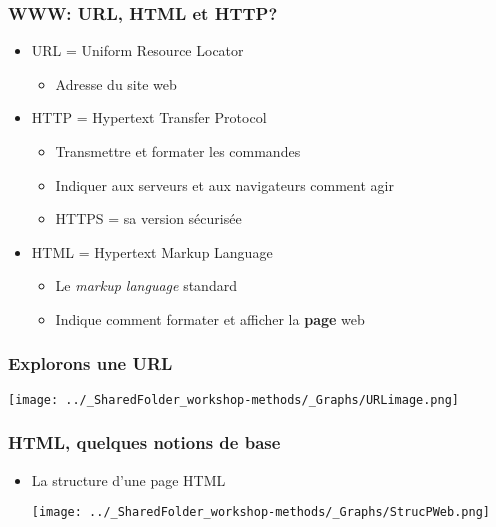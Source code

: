 \documentclass{beamer}
\begin{document}
      \begin{frame}
        \frametitle{WWW: URL, HTML et HTTP?}
        \begin{itemize}
          \item<2-> URL = Uniform Resource Locator
            \begin{itemize}
              \item Adresse du site web
            \end{itemize}
          \item<3-> HTTP = Hypertext Transfer Protocol
            \begin{itemize}
              \item Transmettre et formater les commandes
              \item Indiquer aux serveurs et aux navigateurs comment agir
              \item HTTPS = sa version sécurisée
            \end{itemize}
          \item<4-> HTML = Hypertext Markup Language
            \begin{itemize}
              \item Le \textit{markup language} standard
              \item Indique comment formater et afficher la \textbf{page} web
            \end{itemize}
        \end{itemize}
      \end{frame}
      
      \begin{frame}
        \frametitle{Explorons une URL} \vspace{1cm}
          \begin{center}
            \texttt{[image: ../\_SharedFolder\_workshop-methods/\_Graphs/URLimage.png]}
          \end{center}
      \end{frame}
      
      \begin{frame}
        \frametitle{HTML, quelques notions de base} \vspace{0.3cm}
        \begin{itemize}
          \item<2-> La structure d'une page HTML 
            \begin{center}
            \texttt{[image: ../\_SharedFolder\_workshop-methods/\_Graphs/StrucPWeb.png]}
            \end{center}
        \end{itemize}
      \end{frame}
      
\end{document}
